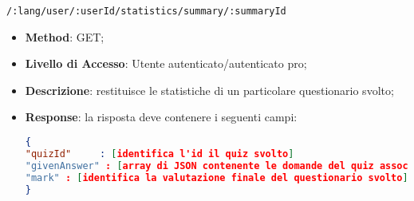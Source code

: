 		
	\item \texttt{/:lang/user/:userId/statistics/summary/:summaryId}
	\begin{itemize}
		\item \textbf{Method}: GET;
		\item \textbf{Livello di Accesso}: Utente autenticato/autenticato pro;
		\item \textbf{Descrizione}: restituisce le statistiche di un particolare questionario svolto; 
		\item \textbf{Response}: la risposta deve contenere i seguenti campi:	
\begin{lstlisting}[language=json,firstnumber=1]
{
"quizId"	 : [identifica l'id il quiz svolto]
"givenAnswer" : [array di JSON contenente le domande del quiz associate alle risposte date dall'utente]
"mark" : [identifica la valutazione finale del questionario svolto]
}	
\end{lstlisting}
	\end{itemize}
	